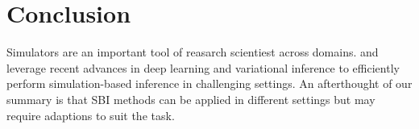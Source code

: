 \documentclass[12pt]{article}
\begin{document}
\section*{Conclusion}
Simulators are an important tool of reasarch scientiest across domains. 
\citet{papamakarios2016fast} and \citet{lueckmann2017flexible} leverage recent advances in deep learning and variational inference to efficiently perform simulation-based inference in challenging settings. An afterthought of our summary is that SBI methods can be applied in different settings but may require adaptions to suit the task.


%





\end{document}
